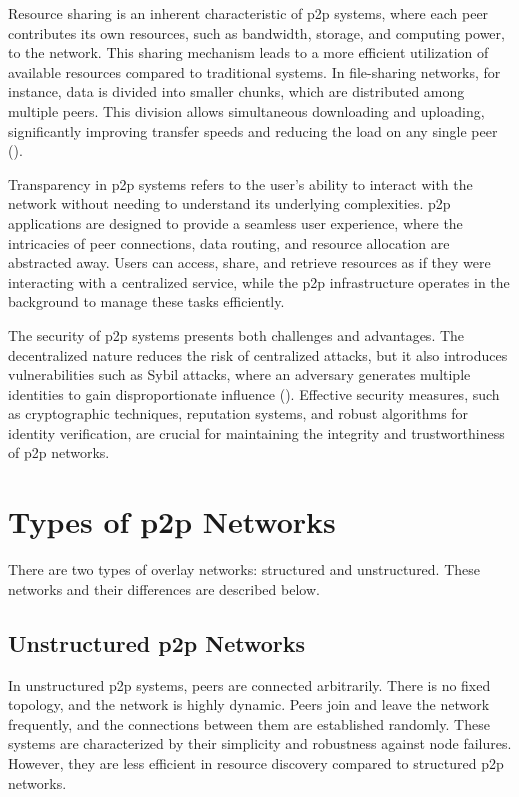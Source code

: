 Resource sharing is an inherent characteristic of \gls{p2p} systems, where each peer contributes its own resources, such as bandwidth, storage, and computing power, to the network.
This sharing mechanism leads to a more efficient utilization of available resources compared to traditional systems.
In file-sharing networks, for instance, data is divided into smaller chunks, which are distributed among multiple peers.
This division allows simultaneous downloading and uploading, significantly improving transfer speeds and reducing the load on any single peer (\cite{cohen2003incentives}).

Transparency in \gls{p2p} systems refers to the user's ability to interact with the network without needing to understand its underlying complexities.
\gls{p2p} applications are designed to provide a seamless user experience, where the intricacies of peer connections, data routing, and resource allocation are abstracted away.
Users can access, share, and retrieve resources as if they were interacting with a centralized service, while the \gls{p2p} infrastructure operates in the background to manage these tasks efficiently.

The security of \gls{p2p} systems presents both challenges and advantages.
The decentralized nature reduces the risk of centralized attacks, but it also introduces vulnerabilities such as Sybil attacks, where an adversary generates multiple identities to gain disproportionate influence (\cite{Douceur2002}).
Effective security measures, such as cryptographic techniques, reputation systems, and robust algorithms for identity verification, are crucial for maintaining the integrity and trustworthiness of \gls{p2p} networks.

\section{Types of \gls{p2p} Networks}
There are two types of overlay networks: structured and unstructured.
These networks and their differences are described below.
\subsection{Unstructured \gls{p2p} Networks}
In unstructured \gls{p2p} systems, peers are connected arbitrarily.
There is no fixed topology, and the network is highly dynamic.
Peers join and leave the network frequently, and the connections between them are established randomly.
These systems are characterized by their simplicity and robustness against node failures.
However, they are less efficient in resource discovery compared to structured \gls{p2p} networks.

